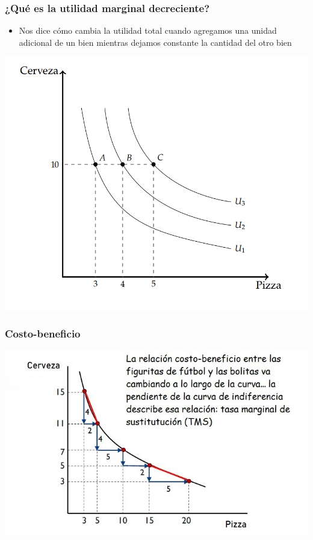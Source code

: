 \documentclass{beamer}
\begin{document}
\begin{frame}
\frametitle{¿Qué es la utilidad marginal decreciente?}
\begin{itemize}
    \item Nos dice cómo cambia la utilidad total cuando agregamos una unidad adicional de un bien mientras dejamos constante la cantidad del otro bien 
    \end{itemize}     
\begin{center}
    \includegraphics[scale=0.5]{Slides Principios de Economia/Figures/C7.9.png}
    \end{center}
\end{frame}

\begin{frame}
\frametitle{Costo-beneficio} 
\centering
\includegraphics[scale=0.65]{Slides Principios de Economia/Figures/Tema_02.17_rp15.jpg}
\end{frame}
\end{document}
